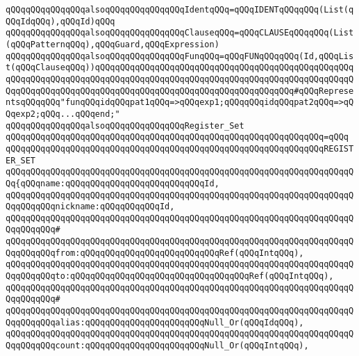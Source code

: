 \newline
\verb|qQQqqQQqqQQqqQQqalsoqQQqqQQqqQQqqQQqIdentqQQq=qQQqIDENTqQQqqQQq(List(qQQqIdqQQq),qQQqId)qQQq|\newline
\newline
\verb|qQQqqQQqqQQqqQQqalsoqQQqqQQqqQQqqQQqClauseqQQq=qQQqCLAUSEqQQqqQQq(List(qQQqPatternqQQq),qQQqGuard,qQQqExpression)|\newline
\newline
\verb|qQQqqQQqqQQqqQQqalsoqQQqqQQqqQQqqQQqFunqQQq=qQQqFUNqQQqqQQq(Id,qQQqList(qQQqClauseqQQq))qQQqqQQqqQQqqQQqqQQqqQQqqQQqqQQqqQQqqQQqqQQqqQQqqQQqqQQqqQQqqQQqqQQqqQQqqQQqqQQqqQQqqQQqqQQqqQQqqQQqqQQqqQQqqQQqqQQqqQQqqQQqqQQqqQQqqQQqqQQqqQQqqQQqqQQqqQQqqQQqqQQqqQQqqQQqqQQqqQQq#qQQqRepresentsqQQqqQQq"funqQQqidqQQqpat1qQQq=>qQQqexp1;qQQqqQQqidqQQqpat2qQQq=>qQQqexp2;qQQq...qQQqend;"|\newline
\newline
\verb|qQQqqQQqqQQqqQQqalsoqQQqqQQqqQQqqQQqRegister_Set|\newline
\verb|qQQqqQQqqQQqqQQqqQQqqQQqqQQqqQQqqQQqqQQqqQQqqQQqqQQqqQQqqQQqqQQq=qQQq|\newline
\verb|qQQqqQQqqQQqqQQqqQQqqQQqqQQqqQQqqQQqqQQqqQQqqQQqqQQqqQQqqQQqqQQqREGISTER_SET|\newline
\verb|qQQqqQQqqQQqqQQqqQQqqQQqqQQqqQQqqQQqqQQqqQQqqQQqqQQqqQQqqQQqqQQqqQQqqQQq{qQQqname:qQQqqQQqqQQqqQQqqQQqqQQqqQQqId,|\newline
\verb|qQQqqQQqqQQqqQQqqQQqqQQqqQQqqQQqqQQqqQQqqQQqqQQqqQQqqQQqqQQqqQQqqQQqqQQqqQQqqQQqnickname:qQQqqQQqqQQqId,|\newline
\verb|qQQqqQQqqQQqqQQqqQQqqQQqqQQqqQQqqQQqqQQqqQQqqQQqqQQqqQQqqQQqqQQqqQQqqQQqqQQqqQQq#|\newline
\verb|qQQqqQQqqQQqqQQqqQQqqQQqqQQqqQQqqQQqqQQqqQQqqQQqqQQqqQQqqQQqqQQqqQQqqQQqqQQqqQQqfrom:qQQqqQQqqQQqqQQqqQQqqQQqqQQqRef(qQQqIntqQQq),|\newline
\verb|qQQqqQQqqQQqqQQqqQQqqQQqqQQqqQQqqQQqqQQqqQQqqQQqqQQqqQQqqQQqqQQqqQQqqQQqqQQqqQQqto:qQQqqQQqqQQqqQQqqQQqqQQqqQQqqQQqqQQqRef(qQQqIntqQQq),|\newline
\verb|qQQqqQQqqQQqqQQqqQQqqQQqqQQqqQQqqQQqqQQqqQQqqQQqqQQqqQQqqQQqqQQqqQQqqQQqqQQqqQQq#|\newline
\verb|qQQqqQQqqQQqqQQqqQQqqQQqqQQqqQQqqQQqqQQqqQQqqQQqqQQqqQQqqQQqqQQqqQQqqQQqqQQqqQQqalias:qQQqqQQqqQQqqQQqqQQqqQQqNull_Or(qQQqIdqQQq),|\newline
\verb|qQQqqQQqqQQqqQQqqQQqqQQqqQQqqQQqqQQqqQQqqQQqqQQqqQQqqQQqqQQqqQQqqQQqqQQqqQQqqQQqcount:qQQqqQQqqQQqqQQqqQQqqQQqNull_Or(qQQqIntqQQq),|\newline
